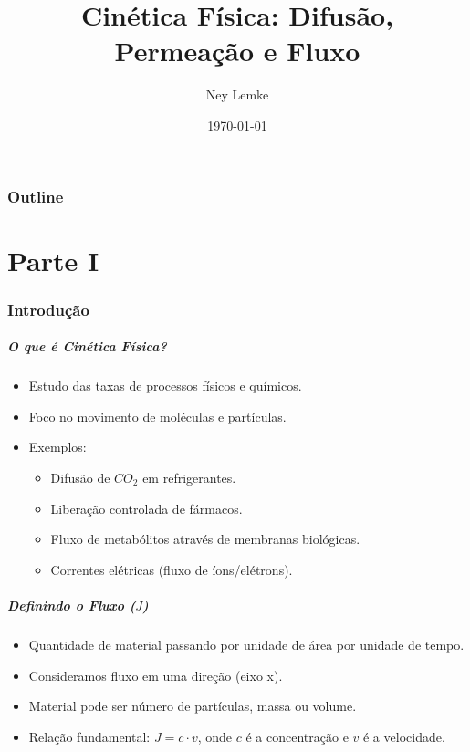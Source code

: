 \documentclass[11pt]{beamer}
\title{Cinética Física: Difusão, Permeação e Fluxo}
\author{Ney Lemke}
\institute[IBB-UNESP]{%
    Departamento de Biofísica e Farmacologia}
\date{\today}
\begin{document}
\frame{\titlepage}

\section*{Outline}

\part{Parte I}


\section{Introdução}

\begin{frame}
    \frametitle{O que é Cinética Física?}
    \begin{itemize}
        \item Estudo das taxas de processos físicos e químicos.
        \item Foco no movimento de moléculas e partículas.
        \item Exemplos:
        \begin{itemize}
            \item Difusão de $CO_2$ em refrigerantes.
            \item Liberação controlada de fármacos.
            \item Fluxo de metabólitos através de membranas biológicas.
            \item Correntes elétricas (fluxo de íons/elétrons).
        \end{itemize}
    \end{itemize}
\end{frame}

\begin{frame}
    \frametitle{Definindo o Fluxo ($J$)}
    \begin{itemize}
        \item Quantidade de material passando por unidade de área por unidade de tempo.
        \item Consideramos fluxo em uma direção (eixo x).
        \item Material pode ser número de partículas, massa ou volume.
        \item Relação fundamental: $J = c \cdot v$, onde $c$ é a concentração e $v$ é a velocidade.
    \end{itemize}
\end{frame}
\end{document}

